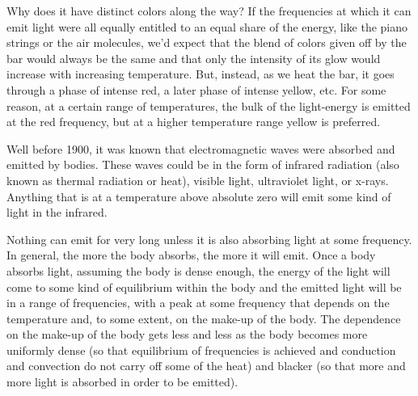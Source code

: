 Why does it have distinct colors along the way? If the frequencies at
which it can emit light were all equally entitled to an equal share of
the energy, like the piano strings or the air molecules, we'd expect
that the blend of colors given off by the bar would always be the same
and that only the intensity of its glow would increase with increasing
temperature. But, instead, as we heat the bar, it goes through a phase
of intense red, a later phase of intense yellow, etc. For some reason,
at a certain range of temperatures, the bulk of the light-energy is
emitted at the red frequency, but at a higher temperature range yellow
is preferred.

Well before 1900, it was known that electromagnetic waves were absorbed
and emitted by bodies. These waves could be in the form of infrared
radiation (also known as thermal radiation or heat), visible light,
ultraviolet light, or x-rays. Anything that is at a temperature above
absolute zero will emit some kind of light in the infrared.

Nothing can emit for very long unless it is also absorbing light at some
frequency. In general, the more the body absorbs, the more it will emit.
Once a body absorbs light, assuming the body is dense enough, the energy
of the light will come to some kind of equilibrium within the body and
the emitted light will be in a range of frequencies, with a peak at some
frequency that depends on the temperature and, to some extent, on the
make-up of the body. The dependence on the make-up of the body gets less
and less as the body becomes more uniformly dense (so that equilibrium
of frequencies is achieved and conduction and convection do not carry
off some of the heat) and blacker (so that more and more light is
absorbed in order to be emitted).

